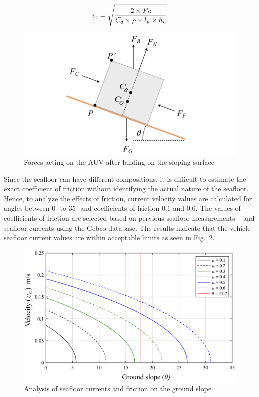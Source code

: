 \begin{equation}
\label{eq:eq4}
\centering
	v_c = \sqrt{ \frac{2 \times Fc}{C_d  \times  \rho  \times  l_u \times h_u}}
\end{equation}


\begin{figure}[!ht]
\centering
\includegraphics[width=4.8in]{./images/mehul9.png}
\caption{Forces acting on the AUV after landing on the sloping surface}
\label{f:mehul9}
\end{figure}

 Since the seafloor can have different compositions, it is difficult to estimate the exact coefficient of friction without identifying the actual nature of the seafloor. Hence, to analyze the effects of friction, current velocity values are calculated for angles between $0^\circ$ to $35^\circ$ and coefficients of friction $0.1$ and $0.6$. The values of coefficients of friction are selected based on pervious seafloor measurements ~\cite{Lambrakos1985} and seafloor currents using the Gebco database. The results indicate that the vehicle seafloor current values are within acceptable limits as seen in Fig.~\ref{f:mehul10}. 
 
\begin{figure}[!ht]
\centering
\includegraphics[width=4.5in]{./images/mehul10.png}
\caption{Analysis of seafloor currents and friction on the ground slope}
\label{f:mehul10}
\end{figure}

